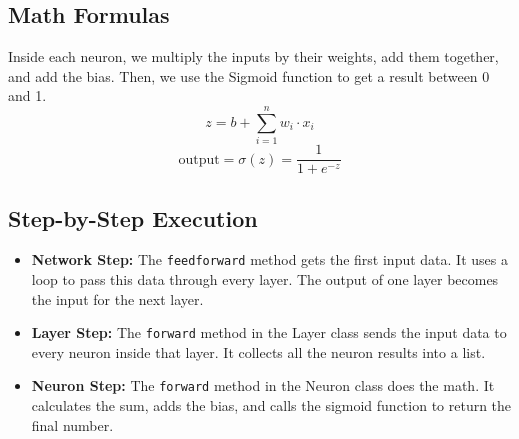 \documentclass[12pt]{article}
\begin{document}
\subsection{Math Formulas}
Inside each neuron, we multiply the inputs by their weights, add them together, and add the bias. Then, we use the Sigmoid function to get a result between 0 and 1.
\begin{equation}
    z = b + \sum_{i=1}^{n} w_i \cdot x_i
\end{equation}
\begin{equation}
    \text{output} = \sigma(z) = \frac{1}{1 + e^{-z}}
\end{equation}

\subsection{Step-by-Step Execution}
\begin{itemize}
    \item \textbf{Network Step:} The \texttt{feedforward} method gets the first input data. It uses a loop to pass this data through every layer. The output of one layer becomes the input for the next layer.
    \item \textbf{Layer Step:} The \texttt{forward} method in the Layer class sends the input data to every neuron inside that layer. It collects all the neuron results into a list.
    \item \textbf{Neuron Step:} The \texttt{forward} method in the Neuron class does the math. It calculates the sum, adds the bias, and calls the sigmoid function to return the final number.
\end{itemize}
\end{document}
